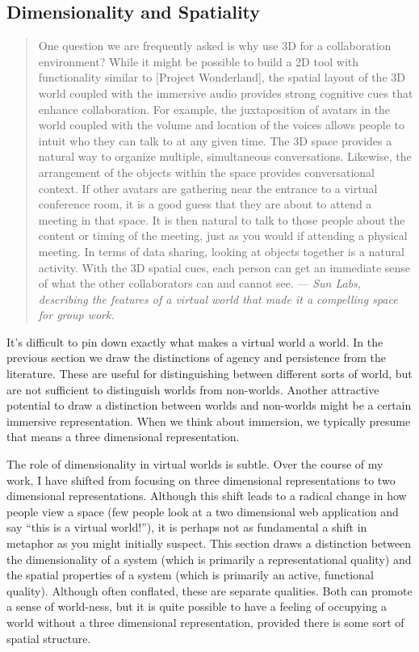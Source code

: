 \subsection{Dimensionality and Spatiality}
\begin{quotation}
One question we are frequently asked is why use 3D for a collaboration environment? While it might be possible to build a 2D tool with functionality similar to [Project Wonderland], the spatial layout of the 3D world coupled with the immersive audio provides strong cognitive cues that enhance collaboration. For example, the juxtaposition of avatars in the world coupled with the volume and location of the voices allows people to intuit who they can talk to at any given time. The 3D space provides a natural way to organize multiple, simultaneous conversations. Likewise, the arrangement of the objects within the space provides conversational context. If other avatars are gathering near the entrance to a virtual conference room, it is a good guess that they are about to attend a meeting in that space. It is then natural to talk to those people about the content or timing of the meeting, just as you would if attending a physical meeting. In terms of data sharing, looking at objects together is a natural activity. With the 3D spatial cues, each person can get an immediate sense of what the other collaborators can and cannot see. --- \emph{Sun Labs, describing the features of a virtual world that made it a compelling space for group work.}\citep{Anonymous:tv}
\end{quotation}

It's difficult to pin down exactly what makes a virtual world a world. In the previous section we draw the distinctions of agency and persistence from the literature. These are useful for distinguishing between different sorts of world, but are not sufficient to distinguish worlds from non-worlds. Another attractive potential to draw a distinction between worlds and non-worlds might be a certain immersive representation. When we think about immersion, we typically presume that means a three dimensional representation. 

The role of dimensionality in virtual worlds is subtle. Over the course of my work, I have shifted from focusing on three dimensional representations to two dimensional representations. Although this shift leads to a radical change in how people view a space (few people look at a two dimensional web application and say ``this is a virtual world!''), it is perhaps not as fundamental a shift in metaphor as you might initially suspect. This section draws a distinction between the dimensionality of a system (which is primarily a representational quality) and the spatial properties of a system (which is primarily an active, functional quality). Although often conflated, these are separate qualities. Both can promote a sense of world-ness, but it is quite possible to have a feeling of occupying a world without a three dimensional representation, provided there is some sort of spatial structure.

